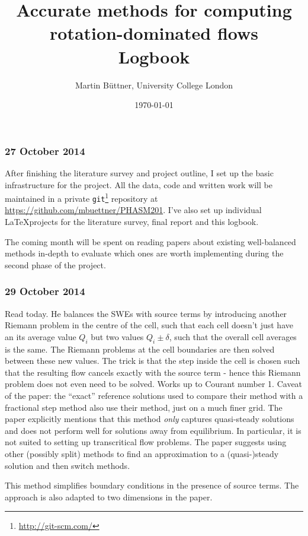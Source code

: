 \documentclass[a4paper,onecolumn,11pt]{report}
\title{Accurate methods for computing rotation-dominated flows\\\small Logbook}
\author{Martin Büttner, University College London}
\date{\today}
\begin{document}
\maketitle

\subsubsection*{27 October 2014}

After finishing the literature survey and project outline, I set up the basic infrastructure for the project. All the data, code and written work will be maintained in a private \texttt{git}\footnote{\url{http://git-scm.com/}} repository at \url{https://github.com/mbuettner/PHASM201}. I've also set up individual \LaTeX projects for the literature survey, final report and this logbook.

The coming month will be spent on reading papers about existing well-balanced methods in-depth to evaluate which ones are worth implementing during the second phase of the project.

\subsubsection*{29 October 2014}

Read \citet{leveque1998balancing} today. He balances the SWEs with source terms by introducing another Riemann problem in the centre of the cell, such that each cell doesn't just have an its average value $Q_i$ but two values $Q_i \pm \delta$, such that the overall cell averages is the same. The Riemann problems at the cell boundaries are then solved between these new values. The trick is that the step inside the cell is chosen such that the resulting flow cancels exactly with the source term - hence this Riemann problem does not even need to be solved. Works up to Courant number 1. Caveat of the paper: the ``exact'' reference solutions used to compare their method with a fractional step method also use their method, just on a much finer grid. The paper explicitly mentions that this method \emph{only} captures quasi-steady solutions and does not perform well for solutions away from equilibrium. In particular, it is not suited to setting up transcritical flow problems. The paper suggests using other (possibly split) methods to find an approximation to a (quasi-)steady solution and then switch methods.

This method simplifies boundary conditions in the presence of source terms. The approach is also adapted to two dimensions in the paper.
\end{document}
